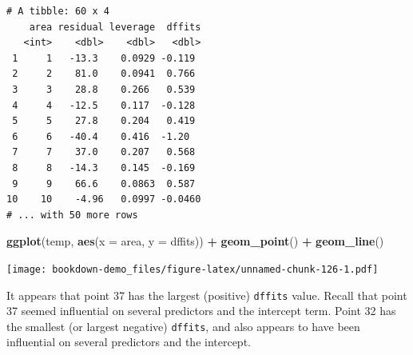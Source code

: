 \documentclass[]{book}
\newenvironment{Shaded}{\begin{snugshade}}{\end{snugshade}}
\newcommand{\KeywordTok}[1]{\textcolor[rgb]{0.13,0.29,0.53}{\textbf{#1}}}
\newcommand{\DataTypeTok}[1]{\textcolor[rgb]{0.13,0.29,0.53}{#1}}
\newcommand{\DecValTok}[1]{\textcolor[rgb]{0.00,0.00,0.81}{#1}}
\newcommand{\StringTok}[1]{\textcolor[rgb]{0.31,0.60,0.02}{#1}}
\newcommand{\OperatorTok}[1]{\textcolor[rgb]{0.81,0.36,0.00}{\textbf{#1}}}
\newcommand{\NormalTok}[1]{#1}
\theoremstyle{definition}
\theoremstyle{definition}
\theoremstyle{definition}
\theoremstyle{remark}
\begin{document}
\begin{Shaded}
\end{Shaded}

\begin{verbatim}
# A tibble: 60 x 4
    area residual leverage  dffits
   <int>    <dbl>    <dbl>   <dbl>
 1     1   -13.3    0.0929 -0.119 
 2     2    81.0    0.0941  0.766 
 3     3    28.8    0.266   0.539 
 4     4   -12.5    0.117  -0.128 
 5     5    27.8    0.204   0.419 
 6     6   -40.4    0.416  -1.20  
 7     7    37.0    0.207   0.568 
 8     8   -14.3    0.145  -0.169 
 9     9    66.6    0.0863  0.587 
10    10    -4.96   0.0997 -0.0460
# ... with 50 more rows
\end{verbatim}

\begin{Shaded}
\begin{Highlighting}[]
\KeywordTok{ggplot}\NormalTok{(temp, }\KeywordTok{aes}\NormalTok{(}\DataTypeTok{x =}\NormalTok{ area, }\DataTypeTok{y =}\NormalTok{ dffits)) }\OperatorTok{+}
\StringTok{    }\KeywordTok{geom_point}\NormalTok{() }\OperatorTok{+}
\StringTok{    }\KeywordTok{geom_line}\NormalTok{()}
\end{Highlighting}
\end{Shaded}

\texttt{[image: bookdown-demo\_files/figure-latex/unnamed-chunk-126-1.pdf]}

It appears that point 37 has the largest (positive) \texttt{dffits}
value. Recall that point 37 seemed influential on several predictors and
the intercept term. Point 32 has the smallest (or largest negative)
\texttt{dffits}, and also appears to have been influential on several
predictors and the intercept.

\begin{Shaded}
\end{Shaded}
\end{document}
